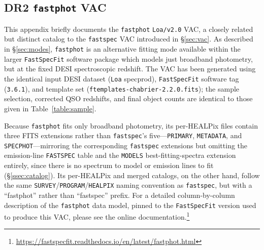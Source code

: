 \documentclass[modern,linenumbers]{aastex702}
\newcommand{\fastspecfit}{\texttt{FastSpecFit}}
\newcommand{\fastspec}{\texttt{fastspec}}
\newcommand{\fastphot}{\texttt{fastphot}}
\begin{document}
\begin{appendix}

\section{DR2 \fastphot{} VAC}
\label{sec:appendix_fastphot}

This appendix briefly documents the \fastphot{} \texttt{Loa/v2.0} VAC,
a closely related but distinct catalog to the \fastspec{} VAC
introduced in \S\ref{sec:vac}. As described in \S\ref{sec:modes},
\fastphot{} is an alternative fitting mode available within the larger
\fastspecfit{} software package which models just broadband
photometry, but at the fixed DESI spectroscopic redshift. The VAC has
been generated using the identical input DESI dataset (\texttt{Loa} specprod),
\fastspecfit{} software tag (\texttt{3.6.1}), and template set
(\texttt{ftemplates-chabrier-2.2.0.fits}); the sample selection,
corrected QSO redshifts, and final object counts are identical to
those given in Table~\ref{table:sample}.

Because \fastphot{} fits only broadband photometry, its per-HEALPix
files contain three FITS extensions rather than \fastspec{}'s
five---\texttt{PRIMARY}, \texttt{METADATA}, and
\texttt{SPECPHOT}---mirroring the corresponding \fastspec{} extensions
but omitting the emission-line \texttt{FASTSPEC} table and the
\texttt{MODELS} best-fitting-spectra extension entirely, since there
is no spectrum to model or emission lines to fit
(\S\ref{ssec:catalog}). Its per-HEALPix and merged catalogs, on the
other hand, follow the same
\texttt{SURVEY}/\texttt{PROGRAM}/\texttt{HEALPIX} naming convention as
\fastspec, but with a ``fastphot'' rather than ``fastspec''
prefix. For a detailed column-by-column description of the \fastphot{}
data model, pinned to the \fastspecfit{} version used to produce this
VAC, please see the online
documentation.\footnote{\url{https://fastspecfit.readthedocs.io/en/latest/fastphot.html}}


\end{appendix}
\end{document}
